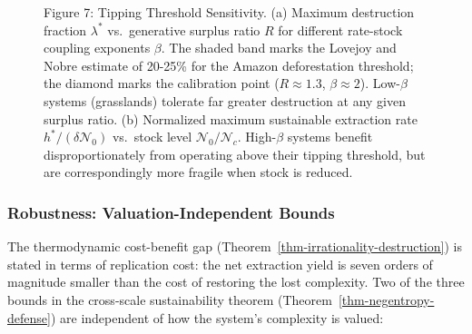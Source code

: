 \documentclass[11pt]{article}
\theoremstyle{plain}
\theoremstyle{definition}
\theoremstyle{remark}
\let\origsubsubsection\subsubsection
\renewcommand{\subsubsection}{\needspace{4\baselineskip}\origsubsubsection}
\newcommand{\pandocbounded}[1]{%
  \sbox0{#1}%
  \ifdim\wd0>\linewidth
    \resizebox{\linewidth}{!}{#1}%
  \else
    #1%
  \fi
}
\begin{document}
\begin{figure}
\centering
\pandocbounded{\includegraphics[keepaspectratio,alt={Figure 7: Tipping Threshold Sensitivity. (a) Maximum destruction fraction \textbackslash lambda\^{}* vs.~generative surplus ratio R for different rate-stock coupling exponents \textbackslash beta. The shaded band marks the Lovejoy and Nobre {[}-@LovejoyNobre2018{]} estimate of 20-25\% for the Amazon deforestation threshold; the diamond marks the calibration point (R \textbackslash approx 1.3, \textbackslash beta \textbackslash approx 2). Low-\textbackslash beta systems (grasslands) tolerate far greater destruction at any given surplus ratio. (b) Normalized maximum sustainable extraction rate h\^{}*/(\textbackslash delta\textbackslash mathcal\{N\}\_0) vs.~stock level \textbackslash mathcal\{N\}\_0/\textbackslash mathcal\{N\}\_c. High-\textbackslash beta systems benefit disproportionately from operating above their tipping threshold, but are correspondingly more fragile when stock is reduced.}]{fig_tipping_threshold.png}}
\caption{Figure 7: Tipping Threshold Sensitivity. (a) Maximum
destruction fraction \(\lambda^*\) vs.~generative surplus ratio \(R\)
for different rate-stock coupling exponents \(\beta\). The shaded band
marks the Lovejoy and Nobre \citeyearpar{LovejoyNobre2018} estimate of
20-25\% for the Amazon deforestation threshold; the diamond marks the
calibration point (\(R \approx 1.3\), \(\beta \approx 2\)).
Low-\(\beta\) systems (grasslands) tolerate far greater destruction at
any given surplus ratio. (b) Normalized maximum sustainable extraction
rate \(h^*/(\delta\mathcal{N}_0)\) vs.~stock level
\(\mathcal{N}_0/\mathcal{N}_c\). High-\(\beta\) systems benefit
disproportionately from operating above their tipping threshold, but are
correspondingly more fragile when stock is reduced.}
\end{figure}

\subsubsection{Robustness: Valuation-Independent
Bounds}\label{robustness-valuation-independent-bounds}

The thermodynamic cost-benefit gap
(Theorem~\ref{thm-irrationality-destruction}) is stated in terms of
replication cost: the net extraction yield is seven orders of magnitude
smaller than the cost of restoring the lost complexity. Two of the three
bounds in the cross-scale sustainability theorem
(Theorem~\ref{thm-negentropy-defense}) are independent of how the
system's complexity is valued:
\end{document}
